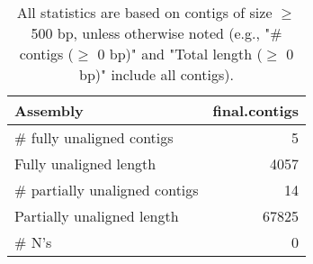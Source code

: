 \documentclass[12pt,a4paper]{article}
\begin{document}
\begin{table}[ht]
\begin{center}
\caption{All statistics are based on contigs of size $\geq$ 500 bp, unless otherwise noted (e.g., "\# contigs ($\geq$ 0 bp)" and "Total length ($\geq$ 0 bp)" include all contigs).}
\begin{tabular}{|l*{1}{|r}|}
\hline
Assembly & final.contigs \\ \hline
\# fully unaligned contigs & 5 \\ \hline
Fully unaligned length & 4057 \\ \hline
\# partially unaligned contigs & 14 \\ \hline
Partially unaligned length & 67825 \\ \hline
\# N's & 0 \\ \hline
\end{tabular}
\end{center}
\end{table}
\end{document}
